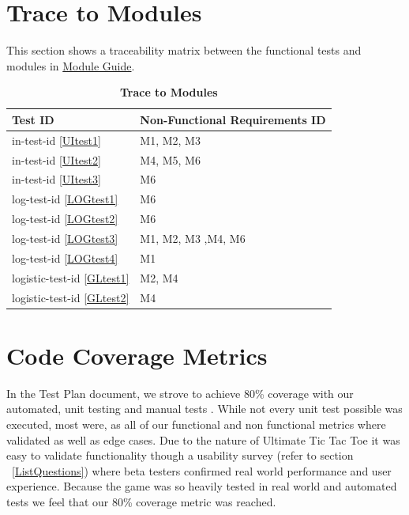 \documentclass[12pt, titlepage]{article}
\newcommand{\UIref}[1]{in-test-id \ref{#1}}
\newcommand{\LOGref}[1]{log-test-id \ref{#1}}
\newcommand{\GLref}[1]{logistic-test-id \ref{#1}}
\begin{document}
\section{Trace to Modules}
This section shows a traceability matrix between the functional tests and modules in \href{run:../Design/MG/MG.pdf}{Module Guide}.

\begin{table}[H]
\caption{\textbf{Trace to Modules}} \label{TbMTrace}
\begin{tabularx}{\textwidth}{p{3.1cm}X}
\toprule
\textbf{Test ID} & \textbf{Non-Functional Requirements ID} \\
\midrule

\UIref{UItest1} & M1, M2, M3  \\
\UIref{UItest2} & M4, M5, M6 \\
\UIref{UItest3} & M6 \\
\LOGref{LOGtest1} & M6\\
\LOGref{LOGtest2} & M6\\
\LOGref{LOGtest3} & M1, M2, M3 ,M4, M6\\
\LOGref{LOGtest4}  & M1\\
\GLref{GLtest1} & M2, M4\\
\GLref{GLtest2} & M4\\

\bottomrule
\end{tabularx}
\end{table}		

\section{Code Coverage Metrics}
In the Test Plan document, we strove to achieve 80\% coverage with our automated, unit testing and manual tests . While not every unit test possible was executed, most were, as all of our functional and non functional metrics where validated as well as edge cases. Due to the nature of Ultimate Tic Tac Toe it was easy to validate functionality though a usability survey (refer to section ~\ref{ListQuestions}) where beta testers confirmed real world performance and user experience. Because the game was so heavily tested in real world and automated tests we feel that our 80\% coverage metric was reached.




\end{document}

